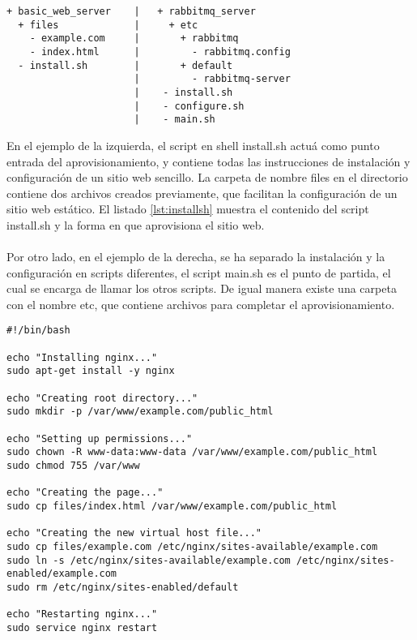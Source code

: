\vspace{4mm}

\begin{lstlisting}[style=json, caption=Escenarios de estructura de un constructor]
+ basic_web_server    |   + rabbitmq_server
  + files             |     + etc
    - example.com     |       + rabbitmq
    - index.html      |         - rabbitmq.config
  - install.sh        |       + default
                      |         - rabbitmq-server
                      |    - install.sh
                      |    - configure.sh
                      |    - main.sh
\end{lstlisting}  

\vspace{5mm}

En el ejemplo de la izquierda, el script en shell install.sh actuá como punto entrada del aprovisionamiento, y contiene todas las instrucciones de instalación y configuración de un sitio web sencillo. La carpeta de nombre files en el directorio contiene dos archivos creados previamente, que facilitan la configuración de un sitio web estático. El listado \ref{lst:installsh} muestra el contenido del script install.sh y la forma en que aprovisiona el sitio web.\\
\\
Por otro lado, en el ejemplo de la derecha, se ha separado la instalación y la configuración en scripts diferentes, el script main.sh es el punto de partida, el cual se encarga de llamar los otros scripts. De igual manera existe una carpeta con el nombre etc, que contiene archivos para completar el aprovisionamiento.
  
\vspace{4mm}

\begin{lstlisting}[style=json, caption=Ejemplo de un script shell, label={lst:installsh}]
#!/bin/bash

echo "Installing nginx..."
sudo apt-get install -y nginx

echo "Creating root directory..."
sudo mkdir -p /var/www/example.com/public_html

echo "Setting up permissions..."
sudo chown -R www-data:www-data /var/www/example.com/public_html
sudo chmod 755 /var/www

echo "Creating the page..."
sudo cp files/index.html /var/www/example.com/public_html

echo "Creating the new virtual host file..."
sudo cp files/example.com /etc/nginx/sites-available/example.com
sudo ln -s /etc/nginx/sites-available/example.com /etc/nginx/sites-enabled/example.com
sudo rm /etc/nginx/sites-enabled/default

echo "Restarting nginx..."
sudo service nginx restart
\end{lstlisting}

